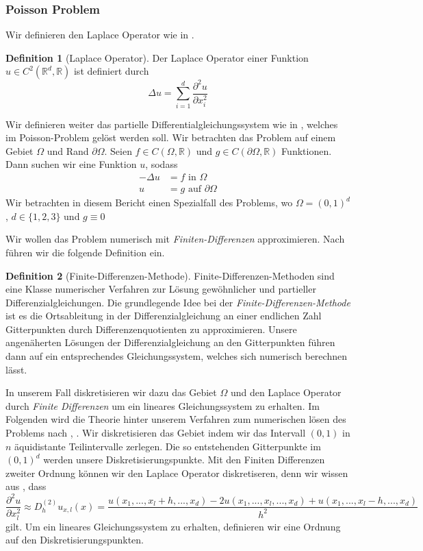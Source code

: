 \documentclass[smallheadings]{scrartcl}
\theoremstyle{definition}
\newtheorem{definition}{Definition}[section]
\begin{document}
	\subsubsection{Poisson Problem}
		 \cbstart Wir definieren den Laplace Operator wie in \citep{PDE}.
		\begin{definition}[Laplace Operator]
		Der Laplace Operator einer Funktion $u\in C^2(\mathbb{R}^d,\mathbb{R})$ ist definiert durch
		$$\Delta u=\sum_{i=1}^d\frac{\partial ^2 u}{\partial x_i^2}$$

		\end{definition}
		Wir definieren weiter das partielle Differentialgleichungssystem wie in \citep{PDE}, welches im Poisson-Problem gelöst werden soll. Wir betrachten das Problem auf einem  Gebiet  $\Omega$ und Rand $\partial \Omega$. Seien $f\in C(\Omega , \mathbb{R})$ und $g\in C(\partial \Omega , \mathbb{R})$ Funktionen. Dann suchen wir eine Funktion $u$, sodass
		\begin{align*}
		-\Delta u&=f \text{ in }\Omega\\
		u&= g \text{ auf }\partial\Omega
		\end{align*}
		Wir betrachten in diesem Bericht einen Spezialfall des Problems, wo $\Omega =(0,1)^d$, $d\in \{1,2,3\}$ und $g\equiv 0$

		Wir wollen das Problem numerisch mit \textit{Finiten-Differenzen} approximieren. Nach \citep{finite} führen wir die folgende Definition ein.
		\begin{definition}[Finite-Differenzen-Methode]
		Finite-Differenzen-Methoden sind eine Klasse numerischer Verfahren zur Lösung gewöhnlicher und partieller Differenzialgleichungen.		
		Die grundlegende Idee bei der \textit{Finite-Differenzen-Methode} ist es die Ortsableitung in der Differenzialgleichung an einer endlichen Zahl Gitterpunkten durch Differenzenquotienten zu approximieren. Unsere angenäherten Lösungen der Differenzialgleichung an den Gitterpunkten führen dann auf ein entsprechendes Gleichungssystem, welches sich numerisch berechnen lässt.
		\end{definition}
		In unserem Fall diskretisieren wir dazu das Gebiet $\Omega$ und den Laplace Operator durch \textit{Finite Differenzen} um ein lineares Gleichungssystem zu erhalten.
		 Im Folgenden wird die Theorie hinter unserem Verfahren zum numerischen lösen des Problems nach \citep{PDE}, \citep{Wiki}. Wir diskretisieren das Gebiet indem wir das Intervall $(0,1)$ in $n$ äquidistante Teilintervalle zerlegen. Die so entstehenden Gitterpunkte im $(0,1)^d$ werden unsere Diskretisierungspunkte. Mit den Finiten Differenzen zweiter Ordnung können wir den Laplace Operator diskretiseren, denn wir wissen aus \citep{Wiki}, dass 
		$$\frac{\partial^2u}{\partial x_l^2} \approx D_h^{(2)} u_{x,l}(x) =\frac{u(x_1,...,x_l+h,...,x_d) - 2u(x_1,...,x_l,...,x_d) + u(x_1,...,x_l-h,...,x_d)}{h^2}$$
		gilt. 
		Um ein lineares Gleichungssystem zu erhalten, definieren wir eine Ordnung auf den Diskretisierungspunkten.
		
\end{document}
